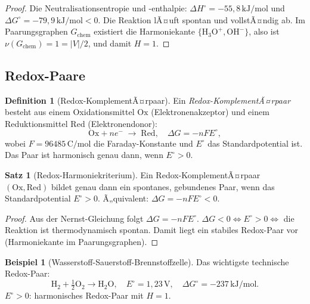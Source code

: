 ﻿\documentclass[a4paper,12pt]{article}
\theoremstyle{definition}
\newtheorem{definition}{Definition}
\newtheorem{beispiel}{Beispiel}
\newtheorem{satz}{Satz}
\begin{document}
\begin{proof}
	Die Neutralisationsentropie und -enthalpie: $\Delta H^\circ = -55{,}8\,\mathrm{kJ/mol}$
	und $\Delta G^\circ = -79{,}9\,\mathrm{kJ/mol} < 0$.
	Die Reaktion lÃ¤uft spontan und vollstÃ¤ndig ab. Im Paarungsgraphen $G_{\mathrm{chem}}$
	existiert die Harmoniekante $\{\mathrm{H_3O}^+, \mathrm{OH}^-\}$, also ist
	$\nu(G_{\mathrm{chem}}) = 1 = |V|/2$, und damit $H = 1$.
\end{proof}

\subsection{Redox-Paare}

\begin{definition}[Redox-KomplementÃ¤rpaar]
	Ein \emph{Redox-KomplementÃ¤rpaar} besteht aus einem Oxidationsmittel
	$\mathrm{Ox}$ (Elektronenakzeptor) und einem Reduktionsmittel $\mathrm{Red}$
	(Elektronendonor):
	\[
		\mathrm{Ox} + n e^- \;\longrightarrow\; \mathrm{Red}, \quad
		\Delta G = -n F E^\circ,
	\]
	wobei $F = 96485\,\mathrm{C/mol}$ die Faraday-Konstante und $E^\circ$ das
	Standardpotential ist. Das Paar ist harmonisch genau dann, wenn $E^\circ > 0$.
\end{definition}

\begin{satz}[Redox-Harmoniekriterium]
	\label{satz:redox}
	Ein Redox-KomplementÃ¤rpaar $(\mathrm{Ox}, \mathrm{Red})$ bildet genau dann ein
	spontanes, gebundenes Paar, wenn das Standardpotential $E^\circ > 0$.
	Ã„quivalent: $\Delta G = -nFE^\circ < 0$.
\end{satz}

\begin{proof}
	Aus der Nernst-Gleichung folgt $\Delta G = -nFE^\circ$.
	$\Delta G < 0 \Leftrightarrow E^\circ > 0 \Leftrightarrow$
	die Reaktion ist thermodynamisch spontan.
	Damit liegt ein stabiles Redox-Paar vor (Harmoniekante im Paarungsgraphen).
\end{proof}

\begin{beispiel}[Wasserstoff-Sauerstoff-Brennstoffzelle]
	Das wichtigste technische Redox-Paar:
	\[
		\mathrm{H_2} + \tfrac{1}{2}\mathrm{O_2} \longrightarrow \mathrm{H_2O},
		\quad E^\circ = 1{,}23\,\mathrm{V},\quad \Delta G^\circ = -237\,\mathrm{kJ/mol}.
	\]
	$E^\circ > 0$: harmonisches Redox-Paar mit $H = 1$.
\end{beispiel}

\end{document}
